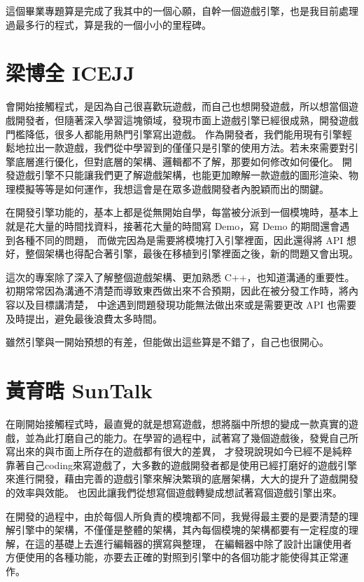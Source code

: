 這個畢業專題算是完成了我其中的一個心願，自幹一個遊戲引擎，也是我目前處理過最多行的程式，算是我的一個小小的里程碑。

\section{梁博全 ICEJJ}
\label{sec:ICEJJ}

會開始接觸程式，是因為自己很喜歡玩遊戲，而自己也想開發遊戲，所以想當個遊戲開發者，但隨著深入學習這塊領域，發現市面上遊戲引擎已經很成熟，開發遊戲門檻降低，很多人都能用熱門引擎寫出遊戲。
作為開發者，我們能用現有引擎輕鬆地拉出一款遊戲，我們從中學習到的僅僅只是引擎的使用方法。若未來需要對引擎底層進行優化，但對底層的架構、邏輯都不了解，那要如何修改如何優化。
開發遊戲引擎不只能讓我們更了解遊戲架構，也能更加瞭解一款遊戲的圖形渲染、物理模擬等等是如何運作，我想這會是在眾多遊戲開發者內脫穎而出的關鍵。

在開發引擎功能的，基本上都是從無開始自學，每當被分派到一個模塊時，基本上就是花大量的時間找資料，接著花大量的時間寫 Demo，寫 Demo 的期間還會遇到各種不同的問題，
而做完因為是需要將模塊打入引擎裡面，因此還得將 API 想好，整個架構也得配合著引擎，最後在移植到引擎裡面之後，新的問題又會出現。

這次的專案除了深入了解整個遊戲架構、更加熟悉 C++，也知道溝通的重要性。初期常常因為溝通不清楚而導致東西做出來不合預期，因此在被分發工作時，將內容以及目標講清楚，
中途遇到問題發現功能無法做出來或是需要更改 API 也需要及時提出，避免最後浪費太多時間。

雖然引擎與一開始預想的有差，但能做出這些算是不錯了，自己也很開心。

\section{黃育晧 SunTalk}
\label{sec:SunTalk}

在剛開始接觸程式時，最直覺的就是想寫遊戲，想將腦中所想的變成一款真實的遊戲，並為此打磨自己的能力。在學習的過程中，試著寫了幾個遊戲後，發覺自己所寫出來的與市面上所存在的遊戲都有很大的差異，
才發現說現如今已經不是純粹靠著自己coding來寫遊戲了，大多數的遊戲開發者都是使用已經打磨好的遊戲引擎來進行開發，藉由完善的遊戲引擎來解決繁瑣的底層架構，大大的提升了遊戲開發的效率與效能。
也因此讓我們從想寫個遊戲轉變成想試著寫個遊戲引擎出來。

在開發的過程中，由於每個人所負責的模塊都不同，我覺得最主要的是要清楚的理解引擎中的架構，不僅僅是整體的架構，其內每個模塊的架構都要有一定程度的理解，在這的基礎上去進行編輯器的撰寫與整理，
在編輯器中除了設計出讓使用者方便使用的各種功能，亦要去正確的對照到引擎中的各個功能才能使得其正常運作。

